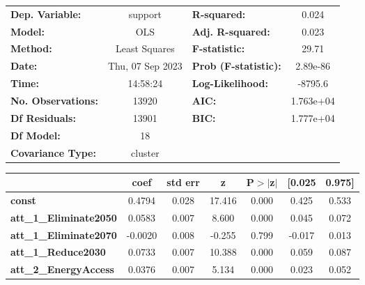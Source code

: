 \begin{center}
\begin{tabular}{lclc}
\toprule
\textbf{Dep. Variable:}              &     support      & \textbf{  R-squared:         } &     0.024   \\
\textbf{Model:}                      &       OLS        & \textbf{  Adj. R-squared:    } &     0.023   \\
\textbf{Method:}                     &  Least Squares   & \textbf{  F-statistic:       } &     29.71   \\
\textbf{Date:}                       & Thu, 07 Sep 2023 & \textbf{  Prob (F-statistic):} &  2.89e-86   \\
\textbf{Time:}                       &     14:58:24     & \textbf{  Log-Likelihood:    } &   -8795.6   \\
\textbf{No. Observations:}           &       13920      & \textbf{  AIC:               } & 1.763e+04   \\
\textbf{Df Residuals:}               &       13901      & \textbf{  BIC:               } & 1.777e+04   \\
\textbf{Df Model:}                   &          18      & \textbf{                     } &             \\
\textbf{Covariance Type:}            &     cluster      & \textbf{                     } &             \\
\bottomrule
\end{tabular}
\begin{tabular}{lcccccc}
                                     & \textbf{coef} & \textbf{std err} & \textbf{z} & \textbf{P$> |$z$|$} & \textbf{[0.025} & \textbf{0.975]}  \\
\midrule
\textbf{const}                       &       0.4794  &        0.028     &    17.416  &         0.000        &        0.425    &        0.533     \\
\textbf{att\_1\_Eliminate2050}       &       0.0583  &        0.007     &     8.600  &         0.000        &        0.045    &        0.072     \\
\textbf{att\_1\_Eliminate2070}       &      -0.0020  &        0.008     &    -0.255  &         0.799        &       -0.017    &        0.013     \\
\textbf{att\_1\_Reduce2030}          &       0.0733  &        0.007     &    10.388  &         0.000        &        0.059    &        0.087     \\
\textbf{att\_2\_EnergyAccess}        &       0.0376  &        0.007     &     5.134  &         0.000        &        0.023    &        0.052     \\

\end{tabular}
\end{center}
